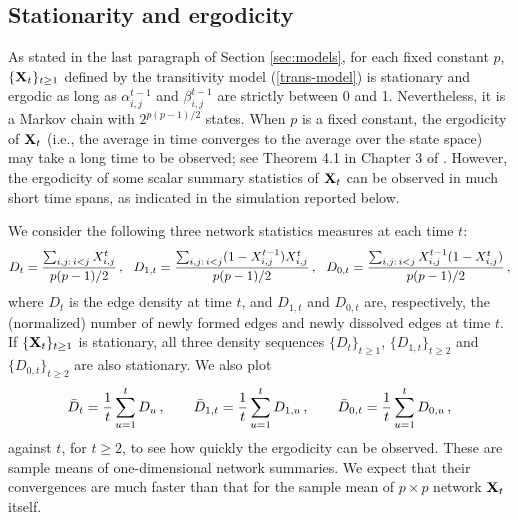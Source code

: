 \documentclass[12pt]{article}
\newcommand{\bX}{{\bf X}}
\newcommand{\0}{{\bf 0}}
\begin{document}
\subsection{Stationarity and ergodicity} \label{sec:simul1}

As stated in the last  paragraph of Section \ref{sec:models}, for each fixed constant $p$, $\{\bX_t\}_{t\geq1}$ defined by the transitivity model (\ref{trans-model}) is stationary and ergodic as long as $\alpha_{i,j}^{t-1}$ and $\beta_{i,j}^{t-1}$ are strictly between 0 and 1. Nevertheless, it is a Markov chain with $2^{p(p-1)/2}$ states. When $p$ is a fixed constant, the ergodicity of $\bX_t$ 
(i.e., the average in time converges to the average over the state space) may take a long time to be observed; see Theorem 4.1 in Chapter 3 of \cite{Bremaud1998_supp}. 
However, the ergodicity of some scalar summary statistics of $\bX_t$ can be observed in much short time spans, as indicated in the simulation reported below.

We  consider
the following three network statistics measures at each time $t$:
\begin{equation}
    \label{eq:3density}
D_t= {\sum_{i,j:\,i < j} X_{i,j}^t \over p(p-1)/2}\,, ~~
D_{1,t} = \frac{\sum_{i,j:\,i < j} (1-X_{i,j}^{t-1}) X_{i,j}^t}{p(p-1)/2}\,,
~~ 
D_{0,t} = \frac{\sum_{i,j:\,i< j} X_{i,j}^{t-1} (1-X_{i,j}^t)}{p(p-1)/2}\,,
\end{equation}
where $D_t$ is the edge density at time $t$, and $D_{1,t}$ and $D_{0,t}$ are, 
respectively, the (normalized) number of newly formed edges and newly dissolved edges at time $t$. If $\{\bX_t\}_{t\geq1}$ is stationary, all three density sequences $\{D_t\}_{t\geq1}$, $\{D_{1,t}\}_{t\geq2}$ and $\{D_{0,t}\}_{t\geq2}$ are also  stationary. We also plot 
\[
\bar D_t = {1 \over t} \sum_{u=1}^t D_u\,, \qquad 
\bar{D}_{1,t} = {1 \over t} \sum_{u=1}^t D_{1,u}\,, \qquad
\bar{D}_{0,t} = {1 \over t} \sum_{u=1}^t D_{0,u}\,,
\]
against $t$, for $t\geq2$, to see how quickly the ergodicity can be observed. These are sample means of one-dimensional network summaries. We expect that their convergences are much faster than that for the sample mean of $p\times p$ network $\bX_t$ itself.
\end{document}
